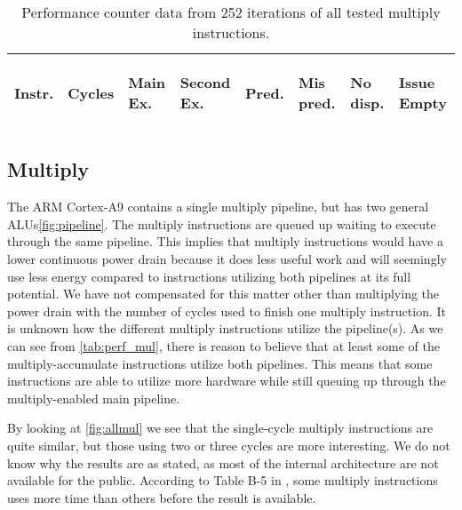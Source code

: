 \begin{table}
    \centering
    \begin{tabular}{|p{0.7cm}|R{0.8cm}R{0.6cm}R{0.85cm}R{0.6cm}R{0.45cm}R{0.75cm}R{0.72cm}|}
        \hline
        \centering
        Instr. &
        \centering
        Cycles &
        \centering
        Main Ex. &
        \centering
        Second Ex. &
        \centering
        Pred.&
        \centering
        Mis pred.&
        \centering
        No disp. &
        \begin{centering}
        Issue Empty
        \end{centering}
        \\
        \hline
        
        \hline
    \end{tabular}
    \caption{Performance counter data from 252 iterations of all tested multiply
    instructions.}
    \label{tab:perf_mul}
\end{table}


\subsection{Multiply}
The ARM Cortex-A9 contains a single multiply pipeline, but has two general
ALUs\autoref{fig:pipeline}. The multiply instructions are queued up waiting to
execute through the same pipeline. This implies that multiply instructions would
have a lower continuous power drain because it does less useful work and will
seemingly use less energy compared to instructions utilizing both pipelines at
its full potential. We have not compensated for this matter other than
multiplying the power drain with the number of cycles used to finish one
multiply instruction. It is unknown how the different multiply instructions
utilize the pipeline(s). As we can see from \autoref{tab:perf_mul}, there is
reason to believe that at least some of the multiply-accumulate instructions
utilize both pipelines\cite{ramangcc}. This means that some instructions are
able to utilize more hardware while still queuing up through the
multiply-enabled main pipeline.

By looking at \autoref{fig:allmul} we see that the single-cycle multiply
instructions are quite similar, but those using two or three cycles are more
interesting. We do not know why the results are as stated, as most of the
internal architecture are not available for the public. According to
Table B-5 in \cite{armtech}, some multiply instructions uses more time than others
before the result is available.

